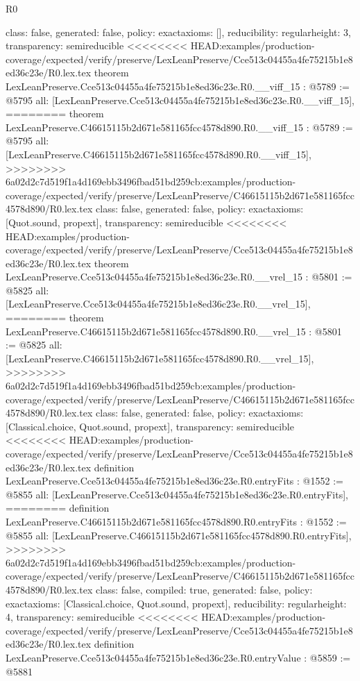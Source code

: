 \begin{lexlean}{R0}
\begin{coremodule}
{{{{{{{{{{{{{{{{{{{{{{{{{{{{{{{{{{{{{{{{{{{{{{{{{{{{{{{{{{{{{{{{{{{{{{{{{{{{{{{{{{{{{{{{{{{{{{{{{  class: false,
  generated: false,
  policy: exact{axioms: []},
  reducibility: regular{height: 3},
  transparency: semireducible
}
<<<<<<<< HEAD:examples/production-coverage/expected/verify/preserve/LexLeanPreserve/Cce513c04455a4fe75215b1e8ed36c23e/R0.lex.tex
theorem LexLeanPreserve.Cce513c04455a4fe75215b1e8ed36c23e.R0.__viff_15 : @5789 := @5795 {
  all: [LexLeanPreserve.Cce513c04455a4fe75215b1e8ed36c23e.R0.__viff_15],
========
theorem LexLeanPreserve.C46615115b2d671e581165fcc4578d890.R0.__viff_15 : @5789 := @5795 {
  all: [LexLeanPreserve.C46615115b2d671e581165fcc4578d890.R0.__viff_15],
>>>>>>>> 6a02d2c7d519f1a4d169ebb3496fbad51bd259cb:examples/production-coverage/expected/verify/preserve/LexLeanPreserve/C46615115b2d671e581165fcc4578d890/R0.lex.tex
  class: false,
  generated: false,
  policy: exact{axioms: [Quot.sound, propext]},
  transparency: semireducible
}
<<<<<<<< HEAD:examples/production-coverage/expected/verify/preserve/LexLeanPreserve/Cce513c04455a4fe75215b1e8ed36c23e/R0.lex.tex
theorem LexLeanPreserve.Cce513c04455a4fe75215b1e8ed36c23e.R0.__vrel_15 : @5801 := @5825 {
  all: [LexLeanPreserve.Cce513c04455a4fe75215b1e8ed36c23e.R0.__vrel_15],
========
theorem LexLeanPreserve.C46615115b2d671e581165fcc4578d890.R0.__vrel_15 : @5801 := @5825 {
  all: [LexLeanPreserve.C46615115b2d671e581165fcc4578d890.R0.__vrel_15],
>>>>>>>> 6a02d2c7d519f1a4d169ebb3496fbad51bd259cb:examples/production-coverage/expected/verify/preserve/LexLeanPreserve/C46615115b2d671e581165fcc4578d890/R0.lex.tex
  class: false,
  generated: false,
  policy: exact{axioms: [Classical.choice, Quot.sound, propext]},
  transparency: semireducible
}
<<<<<<<< HEAD:examples/production-coverage/expected/verify/preserve/LexLeanPreserve/Cce513c04455a4fe75215b1e8ed36c23e/R0.lex.tex
definition LexLeanPreserve.Cce513c04455a4fe75215b1e8ed36c23e.R0.entryFits : @1552 := @5855 {
  all: [LexLeanPreserve.Cce513c04455a4fe75215b1e8ed36c23e.R0.entryFits],
========
definition LexLeanPreserve.C46615115b2d671e581165fcc4578d890.R0.entryFits : @1552 := @5855 {
  all: [LexLeanPreserve.C46615115b2d671e581165fcc4578d890.R0.entryFits],
>>>>>>>> 6a02d2c7d519f1a4d169ebb3496fbad51bd259cb:examples/production-coverage/expected/verify/preserve/LexLeanPreserve/C46615115b2d671e581165fcc4578d890/R0.lex.tex
  class: false,
  compiled: true,
  generated: false,
  policy: exact{axioms: [Classical.choice, Quot.sound, propext]},
  reducibility: regular{height: 4},
  transparency: semireducible
}
<<<<<<<< HEAD:examples/production-coverage/expected/verify/preserve/LexLeanPreserve/Cce513c04455a4fe75215b1e8ed36c23e/R0.lex.tex
definition LexLeanPreserve.Cce513c04455a4fe75215b1e8ed36c23e.R0.entryValue : @5859 := @5881 {
}}}}}}}}}}}}}}}}}}}}}}}}}}}}}}}}}}}}}}}}}}}}}}}}}}}}}}}}}}}}}}}}}}}}}}}}}}}}}}}}}}}}}}}}}}}}}}}}}}}}
\end{coremodule}
\end{lexlean}
